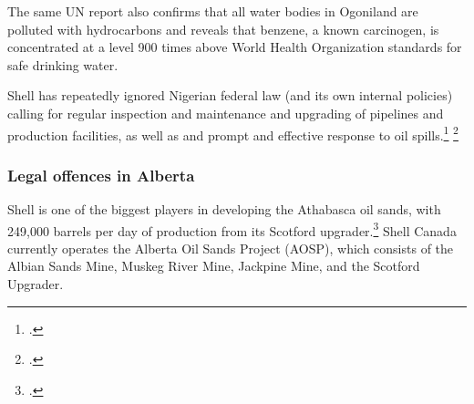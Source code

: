 The same UN report also confirms that all water bodies in Ogoniland are polluted with hydrocarbons and reveals that benzene, a known carcinogen, is concentrated at a level 900 times above World Health Organization standards for safe drinking water.



Shell has repeatedly ignored Nigerian federal law (and its own internal policies) calling for regular inspection and maintenance and upgrading of pipelines and production facilities, as well as and prompt and effective response to oil spills.\footcite[][]{Steiner_2008}  \footcite[][]{Steiner_2010}



	\subsubsection{Legal offences in Alberta}
	


Shell is one of the biggest players in developing the Athabasca oil sands, with 249,000 barrels per day of production from its Scotford upgrader.\footcite{AlbertaEnergy}
Shell Canada currently operates the Alberta Oil Sands Project (AOSP), which consists of the Albian Sands Mine, Muskeg River Mine, Jackpine Mine, and the Scotford Upgrader. 



